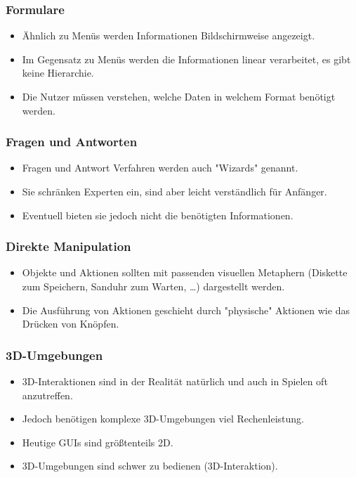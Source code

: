 			\subsubsection{Formulare}
				\begin{itemize}
					\item Ähnlich zu Menüs werden Informationen Bildschirmweise angezeigt.
					\item Im Gegensatz zu Menüs werden die Informationen linear verarbeitet, \dh es gibt keine Hierarchie.
					\item Die Nutzer müssen verstehen, welche Daten in welchem Format benötigt werden.
				\end{itemize}

			\subsubsection{Fragen und Antworten}
				\begin{itemize}
					\item Fragen und Antwort Verfahren werden auch "Wizards" genannt.
					\item Sie schränken Experten ein, sind aber leicht verständlich für Anfänger.
					\item Eventuell bieten sie jedoch nicht die benötigten Informationen.
				\end{itemize}

			\subsubsection{Direkte Manipulation}
				\begin{itemize}
					\item Objekte und Aktionen sollten mit passenden visuellen Metaphern (Diskette zum Speichern, Sanduhr zum Warten, \dots) dargestellt werden.
					\item Die Ausführung von Aktionen geschieht durch "physische" Aktionen wie das Drücken von Knöpfen.
				\end{itemize}

			\subsubsection{3D-Umgebungen}
				\begin{itemize}
					\item 3D-Interaktionen sind in der Realität natürlich und auch in Spielen oft anzutreffen.
					\item Jedoch benötigen komplexe 3D-Umgebungen viel Rechenleistung.
					\item Heutige GUIs sind größtenteils 2D.
					\item 3D-Umgebungen sind schwer zu bedienen (3D-Interaktion).
				\end{itemize}

